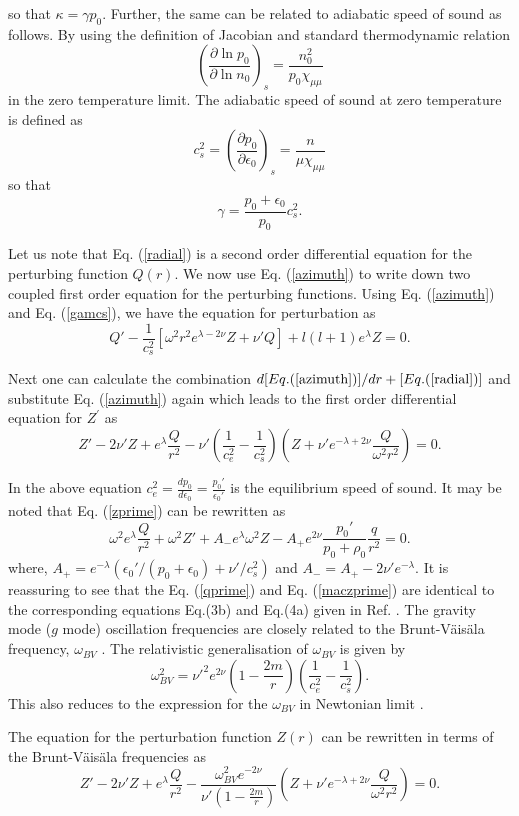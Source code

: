 \documentclass[a4paper, 11pt]{article}
\def\be{\begin{equation}}
\def\ee{\end{equation}}
\begin{document}
\noindent
so that $\kappa=\gamma p_0$. Further, the same can be related to adiabatic speed of sound as follows. By using the definition of Jacobian and standard thermodynamic relation 
\be
\left(\frac{\partial\ln p_0}{\partial\ln n_0}\right)_s=\frac{n_0^2}{p_0\chi_{\mu\mu}}
\ee
in the zero temperature limit. The adiabatic speed of sound at zero temperature is defined as \cite{Albright:2015fpa} $$c_s^2=\left(\frac{\partial p_0}{\partial \epsilon_0}\right)_s=\frac{n}{\mu\chi_{\mu\mu}}$$ so that 
\be
\gamma=\frac{p_0+\epsilon_0}{p_0} c_s^2. \label{gamcs}
\ee

Let us note that Eq. (\ref{radial}) is a second order differential equation for the perturbing function $Q(r)$. We now use Eq. (\ref{azimuth}) to write down two coupled first order equation for the perturbing functions. Using Eq. (\ref{azimuth}) and Eq. (\ref{gamcs}), we have the equation for perturbation as
\be
Q'-\frac{1}{c_s^2}\left[\omega^2 r^2e^{\lambda-2\nu}Z+\nu' Q\right]+l(l+1)e^\lambda Z = 0. \label{qprime}
\ee

Next one can calculate the combination $d[Eq. (\ref{azimuth})]/dr+[Eq. (\ref{radial})]$ and substitute Eq. (\ref{azimuth}) again which leads to the first order differential equation for $Z^{\prime}$ as
\be
Z'-2\nu' Z+e^\lambda \frac{Q}{r^2}-\nu'\left(\frac{1}{c_e^2}-\frac{1}{c_s^2}\right)\left(Z+\nu'e^{-\lambda+2\nu}\frac{Q}{\omega^2r^2}\right)=0. \label{zprime1}
\ee

In the above equation $c_e^2 = \frac{dp_0}{d\epsilon_0} = \frac{p_0'}{\epsilon_0'}$ is the equilibrium speed of sound. It may be noted that Eq. (\ref{zprime}) can be rewritten as 
\be
\omega^2 e^\lambda \frac{Q}{r^2} +\omega^2Z'+A_-e^\lambda \omega^2 Z- A_+ e^{2\nu}\frac{p_0'}{p_0+\rho_0}\frac{q}{r^2}=0. \label{maczprime}
\ee
where, $A_+=e^{-\lambda}(\epsilon_0'/(p_0+\epsilon_0)+\nu'/c_s^2)$ and $A_-=A_+-2\nu'e^{-\lambda}$. It is reassuring to see that the Eq. (\ref{qprime}) and Eq. (\ref{maczprime}) are identical to the corresponding equations Eq.(3b) and Eq.(4a) given in Ref. \cite{McDermott:1983}. The gravity mode ($g$ mode) oscillation frequencies are closely related to the Brunt-V\"{a}is\"{a}la frequency, $\omega_{BV}$ \cite{McDermott:1983}. The relativistic generalisation of $\omega_{BV}$ is given by
\be
\omega_{BV}^2={\nu'}^2 e^{2\nu} \left(1-\frac{2m}{r}\right)\left(\frac{1}{c_e^2}-\frac{1}{c_s^2}\right). \label{omgbv}
\ee
This also reduces to the expression for the $\omega_{BV}$ in Newtonian limit \cite{Goldreich:1994}.

The equation for the perturbation function $Z(r)$ can be rewritten in terms of the Brunt-V\"{a}is\"{a}la frequencies as
\be
Z'-2\nu' Z+e^\lambda \frac{Q}{r^2}-\frac{\omega_{BV}^2 e^{-2\nu}}{\nu'\left(1-\frac{2m}{r}\right)}\left(Z+\nu'e^{-\lambda+2\nu}\frac{Q}{\omega^2r^2}\right)=0. \label{zprime}
\ee
\end{document}
